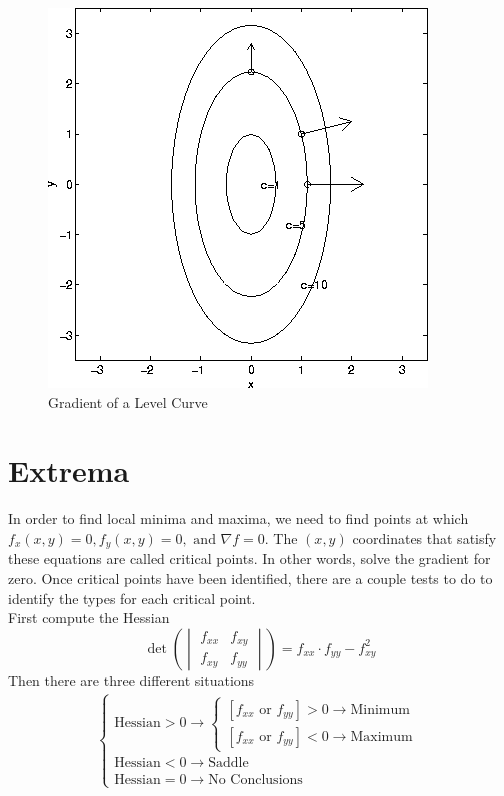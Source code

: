 \documentclass{article}
\begin{document}
\begin{figure}[h]
\centering
    \includegraphics[scale=0.5]{levelgrad.png}
    \caption{Gradient of a Level Curve}
\end{figure}
\section{Extrema}
In order to find local minima and maxima, we need to find points at which $f_x(x,y)=0,f_y(x,y)=0, \text{ and }\nabla f=0$. The $(x,y)$ coordinates that satisfy these equations are called critical points. In other words, solve the gradient for zero. Once critical points have been identified, there are a couple tests to do to identify the types for each critical point.\\

First compute the Hessian
\begin{equation}
\det \left(
\begin{vmatrix}
f_{xx} & f_{xy}\\
f_{xy} & f_{yy}
\end{vmatrix} \right) =
f_{xx} \cdot f_{yy} - f_{xy}^2
\end{equation}
Then there are three different situations
\begin{equation}
\begin{aligned}
\begin{cases}
\text{Hessian} > 0 \to
    \begin{cases}
    [f_{xx}\text{ or }f_{yy}] > 0 \to \text{Minimum}\\
    [f_{xx}\text{ or }f_{yy}] < 0 \to \text{Maximum}
    \end{cases}\\
\text{Hessian} < 0 \to \text{Saddle}\\
\text{Hessian} = 0 \to \text{No Conclusions}
\end{cases}
\end{aligned}
\end{equation}
\end{document}
